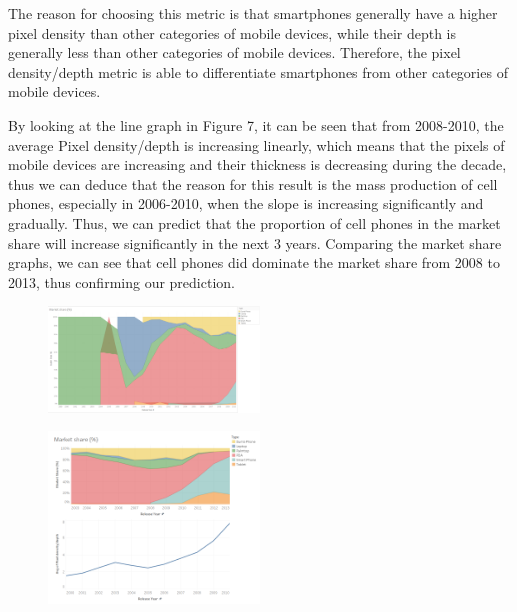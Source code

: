 \documentclass[conference]{IEEEtran}
\begin{document}
The reason for choosing this metric is that smartphones generally have a higher pixel density than other categories of mobile devices, while their depth is generally less than other categories of mobile devices. Therefore, the pixel density/depth metric is able to differentiate smartphones from other categories of mobile devices.

By looking at the line graph in Figure 7, it can be seen that from 2008-2010, the average Pixel density/depth is increasing linearly, which means that the pixels of mobile devices are increasing and their thickness is decreasing during the decade, thus we can deduce that the reason for this result is the mass production of cell phones, especially in 2006-2010, when the slope is increasing significantly and gradually. Thus, we can predict that the proportion of cell phones in the market share will increase significantly in the next 3 years. Comparing the market share graphs, we can see that cell phones did dominate the market share from 2008 to 2013, thus confirming our prediction.

\begin{figure}
    \centering
    \includegraphics[width=0.5\textwidth]{Visualisations/C/Market share 2010.png}
    \caption{}
    \label{}
\end{figure}

\begin{figure}
    \centering
    \includegraphics[width=0.5\textwidth]{Visualisations/C/Piexel density.png}
    \caption{}
    \label{}
\end{figure}

\end{document}
